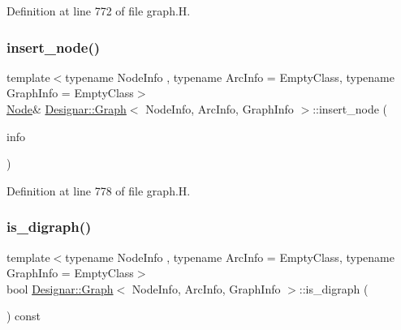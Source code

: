 Definition at line 772 of file graph.\+H.

\mbox{\label{class_designar_1_1_graph_abbf6788c27f9719907d31fe7f7a83920}} 
\subsubsection{\texorpdfstring{insert\+\_\+node()}{insert\_node()}\hspace{0.1cm}{\footnotesize\ttfamily [4/4]}}
{\footnotesize\ttfamily template$<$typename Node\+Info , typename Arc\+Info  = Empty\+Class, typename Graph\+Info  = Empty\+Class$>$ \\
\hyperlink{class_designar_1_1_graph_a5dfc7dba9d092ac489c72e40390c37d0}{Node}\& \hyperlink{class_designar_1_1_graph}{Designar\+::\+Graph}$<$ Node\+Info, Arc\+Info, Graph\+Info $>$\+::insert\+\_\+node (\begin{DoxyParamCaption}\item[{Node\+Info \&\&}]{info }\end{DoxyParamCaption})\hspace{0.3cm}{\ttfamily [inline]}}



Definition at line 778 of file graph.\+H.

\mbox{\label{class_designar_1_1_graph_af0e0b3d1d6a52e0f3d3225f1fa274211}} 
\subsubsection{\texorpdfstring{is\+\_\+digraph()}{is\_digraph()}}
{\footnotesize\ttfamily template$<$typename Node\+Info , typename Arc\+Info  = Empty\+Class, typename Graph\+Info  = Empty\+Class$>$ \\
bool \hyperlink{class_designar_1_1_graph}{Designar\+::\+Graph}$<$ Node\+Info, Arc\+Info, Graph\+Info $>$\+::is\+\_\+digraph (\begin{DoxyParamCaption}{ }\end{DoxyParamCaption}) const\hspace{0.3cm}{\ttfamily [inline]}}



